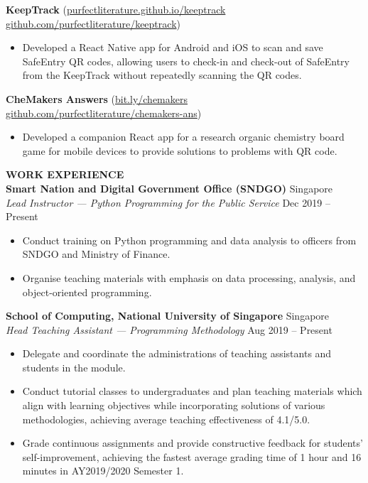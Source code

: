 \documentclass[a4paper, 11pt]{article}
\newcommand{\interspace}{\vspace{7pt}}
\newcommand{\intraspace}{\vspace{2pt}}
\begin{document}
	\intraspace
	
	\textbf{KeepTrack} (\href{https://purfectliterature.github.io/keeptrack/}{purfectliterature.github.io/keeptrack} \textbar\space \href{https://github.com/purfectliterature/keeptrack}{github.com/purfectliterature/keeptrack})
	\begin{itemize}[leftmargin=*, noitemsep, topsep=0pt]
		\item Developed a React Native app for Android and iOS to scan and save SafeEntry QR codes, allowing users to check-in and check-out of SafeEntry from the KeepTrack without repeatedly scanning the QR codes.
	\end{itemize}

	\intraspace
	
	\textbf{CheMakers Answers} (\href{http://bit.ly/chemakers}{bit.ly/chemakers} \textbar\space \href{http://github.com/purfectliterature/chemakers-ans}{github.com/purfectliterature/chemakers-ans})
	\begin{itemize}[leftmargin=*, noitemsep, topsep=0pt]
		\item Developed a companion React app for a research organic chemistry board game for mobile devices to provide solutions to problems with QR code.
	\end{itemize}
	
	\interspace
	
	\textbf{\large WORK EXPERIENCE} \hrulefill \\
	\textbf{Smart Nation and Digital Government Office (SNDGO)} \hfill Singapore\\
	\textit{Lead Instructor --- Python Programming for the Public Service} \hfill Dec 2019 -- Present
	\begin{itemize}[leftmargin=*, noitemsep, topsep=0pt]
		\item Conduct training on Python programming and data analysis to officers from SNDGO and Ministry of Finance.
		\item Organise teaching materials with emphasis on data processing, analysis, and object-oriented programming.
	\end{itemize}

	\intraspace
	
	\textbf{School of Computing, National University of Singapore} \hfill Singapore\\
	\textit{Head Teaching Assistant --- Programming Methodology} \hfill Aug 2019 -- Present
	\begin{itemize}[leftmargin=*, noitemsep, topsep=0pt]
		\item Delegate and coordinate the administrations of teaching assistants and students in the module.
		\item Conduct tutorial classes to undergraduates and plan teaching materials which align with learning objectives while incorporating solutions of various methodologies, achieving average teaching effectiveness of 4.1/5.0.
		\item Grade continuous assignments and provide constructive feedback for students’ self-improvement, achieving the fastest average grading time of 1 hour and 16 minutes in AY2019/2020 Semester 1.
	\end{itemize}
	
\end{document}
